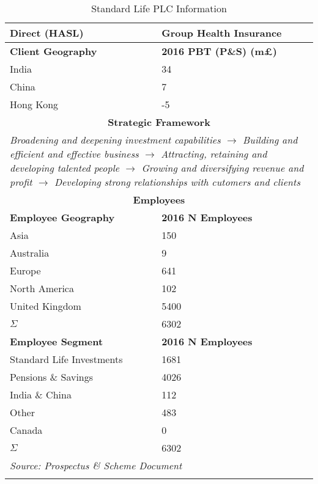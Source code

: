 \documentclass[11pt, english]{article}
\begin{document}
\begin{center}
\begin{longtable}{p{5cm}p{6cm}}
	Direct (HASL) & Group Health Insurance\\
	\hline
        \textbf{Client Geography} & \textbf{2016 PBT (P\&S) (m\pounds)}\\         
        \hline
	India & 34\\
        China & 7\\
        Hong Kong & -5\\
	\hline
	\hline
	\multicolumn{2}{c}{\textbf{Strategic Framework}}\\
	\hline
	\hline
	\multicolumn{2}{p{12cm}}{\textit{Broadening and deepening investment capabilities $\rightarrow$ Building and efficient and effective business $\rightarrow$ Attracting, retaining and developing talented people $\rightarrow$ Growing and diversifying revenue and profit $\rightarrow$ Developing strong relationships with cutomers and clients}}\\
	\hline
        \hline
	\multicolumn{2}{c}{\textbf{Employees}}\\ 
        \hline
        \hline
	\textbf{Employee Geography} & \textbf{2016 N Employees}\\
	\hline
	Asia & 150\\
	Australia & 9\\
	Europe & 641\\
	North America & 102\\
	United Kingdom & 5400\\
	\hline
	$\Sigma$ & 6302\\
	\hline
	\textbf{Employee Segment} & \textbf{2016 N Employees}\\
	\hline
	Standard Life Investments & 1681\\
	Pensions \& Savings & 4026\\
	India \& China & 112\\
	Other & 483\\
	Canada & 0\\
	\hline
	$\Sigma$ & 6302\\
	\hline
	\multicolumn{2}{l}{\textit{Source: Prospectus \& Scheme Document}}\\
	\hline
	\caption{Standard Life PLC Information}
\end{longtable}
\end{center}

\newpage
\end{document}
